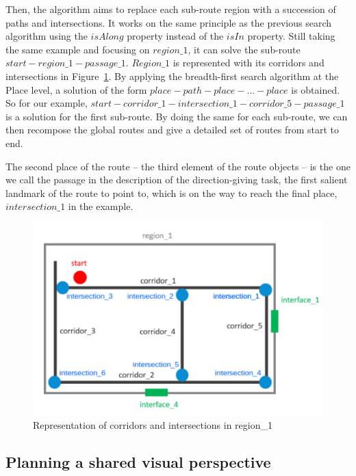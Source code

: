 \documentclass[a4paper,11pt,twoside]{StyleThese}
\begin{document}
Then, the algorithm aims to replace each sub-route region with a succession of paths and intersections. It works on the same principle as the previous search algorithm using the $isAlong$ property instead of the $isIn$ property. Still taking the same example and focusing on $region\_1$, it can solve the sub-route \( start - region\_1 - passage\_1\). $Region\_1$ is represented with its corridors and intersections in Figure~\ref{fig:chap3_region_1}. By applying the breadth-first search algorithm at the Place level, a solution of the form $place - path - place - ... - place$ is obtained. So for our example, \(start - corridor\_1 - intersection\_1 - corridor\_5 - passage\_1\) is a solution for the first sub-route. By doing the same for each sub-route, we can then recompose the global routes and give a detailed set of routes from start to end.

The second place of the route -- the third element of the route objects -- is the one we call the passage in the description of the direction-giving task, the first salient landmark of the route to point to, which is on the way to reach the final place, \ie \(intersection\_1\) in the example.

\begin{figure}[ht]
	\centering
	\includegraphics[scale=0.25]{figures/chapter3/region_1.png}
	\caption{\label{fig:chap3_region_1} Representation of corridors and intersections in region\_1}
\end{figure}

\subsection{Planning a shared visual perspective}\label{subsec:svp}
\end{document}

